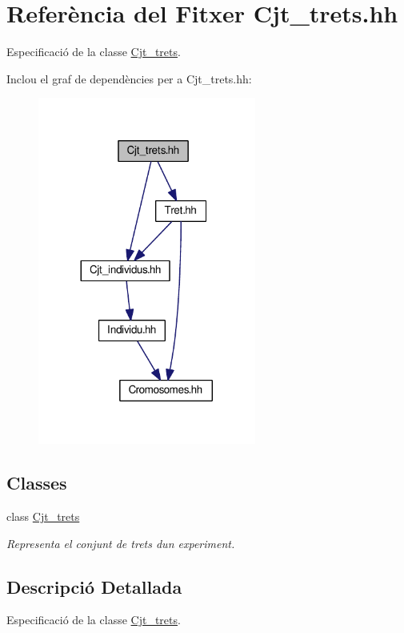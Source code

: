 \hypertarget{_cjt__trets_8hh}{}\section{Referència del Fitxer Cjt\+\_\+trets.\+hh}
\label{_cjt__trets_8hh}


Especificació de la classe \hyperlink{class_cjt__trets}{Cjt\+\_\+trets}.  


Inclou el graf de dependències per a Cjt\+\_\+trets.\+hh\+:
\nopagebreak
\begin{figure}[H]
\begin{center}
\leavevmode
\includegraphics[width=203pt]{_cjt__trets_8hh__incl}
\end{center}
\end{figure}
\subsection*{Classes}
\begin{DoxyCompactItemize}
\item 
class \hyperlink{class_cjt__trets}{Cjt\+\_\+trets}
\begin{DoxyCompactList}\small\item\em Representa el conjunt de trets d\textquotesingle{}un experiment. \end{DoxyCompactList}\end{DoxyCompactItemize}


\subsection{Descripció Detallada}
Especificació de la classe \hyperlink{class_cjt__trets}{Cjt\+\_\+trets}. 

